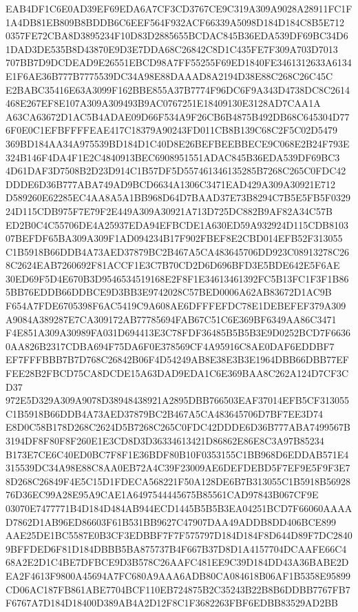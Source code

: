 \documentclass[UTF8,fontset=fandol,zihao=-4,a4paper]{ctexart}
\begin{document}
{{EAB4DF1C6E0AD39EF69EDA6A7CF3CD3767CE9C319A309A9028A28911FC1F1A4DB81EB809B8BDDB6C6EEF564F932ACF66339A5098D184D184C8B5E712
0357FE72CBA8D3895234F10D83D2885655BCDAC845B36EDA539DF69BC34D61DAD3DE535B8D43870E9D3E7DDA68C26842C8D1C435FE7F309A703D7013
707BB7D9DCDEAD9E26551EBCD98A7FF55255F69ED1840FE3461312633A6134E1F6AE36B777B7775539DC34A98E88DAAAD8A2194D38E88C268C26C45C
E2BABC35416E63A3099F162BBE855A37B7774F96DC6F9A343D4738DC8C2614468E267EF8E107A309A309493B9AC0767251E18409130E3128AD7CAA1A
A63CA63672D1AC5B4ADAE09D66F534A9F26CB6B4875B492DB68C645304D776F0E0C1EFBFFFFEAE417C18379A90243FD011CB8B139C68C2F5C02D5479
369BD184AA34A975539BD184D1C40D8E26BEFBEEBBECE9C068E2B24F793E324B146F4DA4F1E2C4840913BEC6908951551ADAC845B36EDA539DF69BC3
4D61DAF3D7508B2D23D914C1B57DF5D557461346135285B7268C265C0FDC42DDDE6D36B777ABA749AD9BCD6634A1306C3471EAD429A309A30921E712
D589260E62285EC4AA8A5A1BB968D64D7BAAD37E73B8294C7B5E5FB5F032924D115CDB975F7E79F2E449A309A30921A713D725DC882B9AF82A34C57B
ED2B0C4C55706DE4A25937EDA94EFBCDE1A630ED59A932924D115CDB810307BEFDF65BA309A309F1AD094234B17F902FBEF8E2CBD014EFB52F313055
C1B5918B66DDB4A73AED37879BC2B467A5CA483645706DD923C08913278C268C2624EAB7260692F81ACCF1E3C7B70CD2D6D696BFD3E5BDE642E5F6AE
30ED69F5D4E670B3D9546534519168E2F8F1E34613461392FC5B13FC1F3F1B865BB76EDDB66DDBCE9D3BB3E9742028C57BED0006A62AB83672D1AC9B
F654A7FDE6705398F6AC5419C9A608AE6DFFFEFDC78E1DEBEFEF379A309A9084A389287E7CA309172AB77785694FAB67C51C6E369BF6349AA86C3471
F4E851A309A30989FA031D694413E3C78FDF36485B5B5B3E9D0252BCD7F66360AA826B2317CDBA694F75DA6F0E378569CF4A95916C8AE0DAF6EDDBF7
EF7FFFBBB7B7D768C26842B06F4D54249AB8E38E3B3E1964DBB66DBB77EFFEE28B2FBCD75CA8DCDE15A63DAD9EDA1C6E369BAA8C262A124D7CF3CD37
972E5D329A309A9078D38948438921A2895DBB766503EAF37014EFB5CF313055C1B5918B66DDB4A73AED37879BC2B467A5CA483645706D7BF7EE3D74
E8D0C58B178D268C2624D5B7268C265C0FDC42DDDE6D36B777ABA7499567B3194DF8F80F8F260E1E3CD8D3D36334613421D86862E86E8C3A97B85234
B173E7CE6C40ED0BC7F8F1E36BDF80B10F0353155C1BB968D6EDDAB571E4315539DC34A98E88C8AA0EB72A4C39F23009AE6DEFDEBD5F7EF9E5F9F3E7
8D268C26849F4E5C15D1FDECA568221F50A128DE6B7B313055C1B5918B5692876D36EC99A28E95A9CAE1A6497544445675B85561CAD97843B067CF9E
03070E7477771B4D184D484AB944ECD1445B5B5B3EA04251BCD7F66060AAAAD7862D1AB96ED86603F61B531BB9627C47907DAA49ADDB8DD406BCE899
AAE25DE1BC5587E0B3CF3EDBBF7F7F575797D184D184F8D644D89F7DC28409BFFDED6F81D184DBBB5BA875737B4F667B37D8D1A4157704DCAAFE66C4
68A2E2D1C4BE7DFBCE9D3B578C26AAFC481EE9C39D184DD43A36BABE2DEA2F4613F9800A45694A7FC680A9AAA6ADB80CA084618B06AF1B5358E95899
CD06AC187FB861ABE7704BCF110EB724875B2C35243B22B8B6DDBB7767FB7F6767A7D184D18400D389AB4A2D12F8C1F3682263FBF6EDBB83529AD2BB
}}
\end{document}
